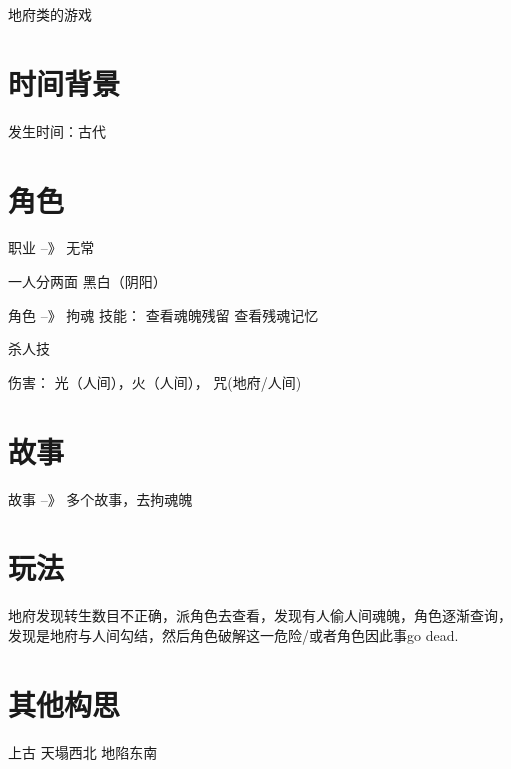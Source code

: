 \documentclass{article}
\begin{document}
地府类的游戏

\section{时间背景}
发生时间：古代

\section{角色}
职业 --》 无常

一人分两面 黑白（阴阳）

角色 --》 拘魂
技能：
    查看魂魄残留
    查看残魂记忆
    
杀人技

伤害：
    光（人间），火（人间），
    咒(地府/人间)

\section{故事}
故事 --》 多个故事，去拘魂魄

\section{玩法}
地府发现转生数目不正确，派角色去查看，发现有人偷人间魂魄，角色逐渐查询，发现是地府与人间勾结，然后角色破解这一危险/或者角色因此事go dead.



\section{其他构思}
上古 天塌西北 地陷东南
\end{document}
